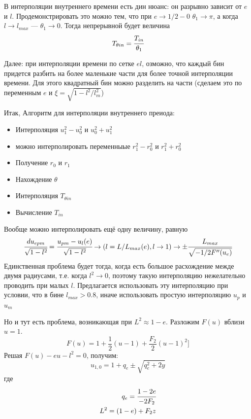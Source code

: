 \documentclass[a4paper, 14pt]{article}
\begin{document}
	В интерполяции внутреннего времени есть дин нюанс: он разрывно зависит от $e$ и $l$.
	Продемонстрировать это можно тем, что при $e \rightarrow 1/2-0$ $\theta_1 \rightarrow \pi$, а когда  $l \rightarrow l_{max}$ --- $\theta_1 \rightarrow 0$. Тогда непрерывной будет величина 
	\begin{equation}
		T_{\theta in} = \cfrac{T_{in}}{\theta_1}
	\end{equation}
	
	\iffalse
	Далее: при интерполяции времени по сетке $el$, озможно, что каждый бин придется разбить на более маленькие части для более точной интерполяции времени. Для этого квадратный бин можно разделить на части (сделаем это по переменным $e$ и $\xi = \sqrt{1-l^2/l_m^2}$)
	
	Итак, Алгоритм для интерполяции внутреннего преиода:
	\begin{itemize}
		\item Интерполяция $u_1^2-u_0^2$ и $u_0^2+u_1^2$
		\item можно интерполировать переменныые $r_1^2-r_0^2$ и $r_1^2+r_0^2$
		\item Получение $r_0$ и $r_1$
		\item Нахождение $\theta$
		\item Интерполяция $T_{\theta in}$ 
		\item Вычисление $T_{in}$
	\end{itemize}
	
	Вообще можно интерполировать ещё одну величину, равную
	\begin{equation}
		\cfrac{du_{e pm}}{\sqrt{1 - l^2}} = \cfrac{u_{pm} - u_l(e)}{\sqrt{1 - l^2}}  \rightarrow  ( l = L/L_{max}(e),  l \rightarrow 1)  \rightarrow  \pm \cfrac{L_{max}}{\sqrt{-1/2F''(u_e)}}
		\label{eq:duepm}
	\end{equation}
	Единственная проблема будет тогда, когда есть большое расхождение межде двумя радиусами, т.е. когда $l^2 \rightarrow 0$, поэтому такую интерполяцию нежелательно проводить при малых $l$.
	Предлагается использовать эту интерполяцию при условии, что в бине $l_{max} > 0.8$, иначе использовать простую интерполяцию $u_p$ и $u_m$
	
	Но и тут есть проблема, возникающая при $L^2 \approx 1-e$. Разложим $F(u)$ вблизи $u = 1$.
	 \begin{equation}
		F(u) = 1 + \frac{1}{2} (u-1) + \frac{F_2}{2}(u-1)^2
	 	]\label{eq:Fu_more_1}
	 \end{equation}
	 Решая $F(u) - eu - l^2 = 0$, получим:
	\begin{equation}
	 	u_{1,0} = 1 + q_e \pm \sqrt{q_e^2 + 2y}
	 	\label{eq:u01_near1}
	\end{equation}
	где
	\begin{eqnarray*}
		q_e = \cfrac{1-2e}{-2F_2}\\
		L^2 = (1-e) + F_2z
	\end{eqnarray*}
	
\end{document}
